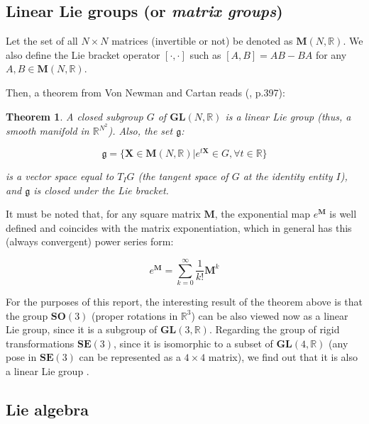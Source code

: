 \documentclass[a4paper,11pt]{report}
\newtheorem{mytheorem}{Theorem}
\begin{document}
\subsection{Linear Lie groups (or \emph{matrix groups})}
\label{sect:lie:linear}

Let the set of all $N \times N$ matrices (invertible or not)
be denoted as $\mathbf{M}(N,\mathbb{R})$.
We also define the Lie bracket operator $[\cdot,\cdot]$ such as
$[A,B]=AB-BA$ for any $A,B \in \mathbf{M}(N,\mathbb{R})$.

Then, a theorem from Von Newman and Cartan reads (\cite{gallier2001geometric}, p.397):

\begin{mytheorem}
A closed subgroup $G$ of $\mathbf{GL}(N,\mathbb{R})$
is a linear Lie group (thus, a smooth manifold in $\mathbb{R}^{N^2}$).
Also, the set $\mathfrak{g}$:

\begin{equation}
  \mathfrak{g} = \{ \mathbf{X} \in \mathbf{M}(N,\mathbb{R}) | e^{t\mathbf{X}} \in G,  \forall t \in \mathbb{R}  \}
\end{equation}

\noindent is a vector space equal to $T_I G$ (the tangent space of $G$
at the identity entity $I$), and $\mathfrak{g}$ is closed under the Lie bracket.
\end{mytheorem}

It must be noted that, for any square matrix $\mathbf{M}$,
the exponential map $e^{\mathbf{M}}$ is well defined and coincides with the matrix
exponentiation, which in general has this (always convergent) power series form:

\begin{equation}
\label{eq:exp_map_matrices}
e^{\mathbf{M}} = \sum_{k=0}^\infty \frac{1}{k!} \mathbf{M}^k
\end{equation}


For the purposes of this report, the interesting result of the theorem
above is that the group $\mathbf{SO}(3)$ (proper rotations in $\mathbb{R}^3$)
can be also viewed now as a linear Lie group, since it is a
subgroup of $\mathbf{GL}(3,\mathbb{R})$.
Regarding the group of rigid transformations $\mathbf{SE}(3)$,
since it is isomorphic to a subset of $\mathbf{GL}(4,\mathbb{R})$
(any pose in $\mathbf{SE}(3)$ can be represented as a $4\times 4$ matrix),
we find out that it is also a linear Lie group \cite{gallier2001geometric}.


\subsection{Lie algebra}
\end{document}
